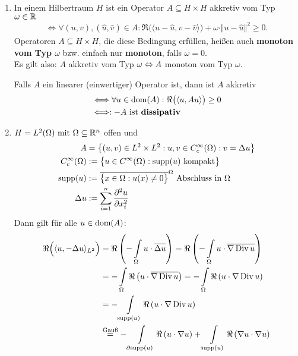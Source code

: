 \begin{beispiel}\
\begin{enumerate}[label=(\alph*)]
\item In einem Hilbertraum $H$ ist ein Operator $A\subseteq H\times H$ akkretiv vom Typ $\omega\in\mathbb{R}$
\begin{align*}
\Longleftrightarrow\forall(u,v),(\hat{u},\hat{v})\in A:
 \Re\big(\langle u-\hat{u},v-\hat{v}\rangle\big)+\omega\cdot\Vert u-\hat{u}\Vert^2\geq0.
\end{align*}
Operatoren $A\subseteq H\times H$, die diese Bedingung erfüllen, heißen auch \textbf{monoton vom Typ $\omega$} bzw. einfach nur \textbf{monoton}, falls $\omega=0$.\\
Es gilt also: $A$ akkretiv vom Typ $\omega\Leftrightarrow A$ monoton vom Typ $\omega$.

Falls $A$ ein linearer (einwertiger) Operator ist, dann ist $A$ akkretiv
\begin{align*}
&\Longleftrightarrow\forall u\in\text{dom}(A):\Re\big(\langle u, Au\rangle\big)\geq0\\
&\Longleftrightarrow: -A\text{ ist \textbf{dissipativ}}
\end{align*}
\item $H=L^2(\Omega)\text{ mit }\Omega\subseteq\mathbb{R}^n$ offen und 
\begin{align*}
A&=\big\lbrace(u,v)\in L^2\times L^2:u,v\in C_c^\infty(\Omega):v=\Delta u\big\rbrace\\
C_c^\infty(\Omega)&:=\big\lbrace u\in C^\infty(\Omega):\text{supp}(u)\text{ kompakt}\big\rbrace\\
\text{supp}(u)&:=\overline{\big\lbrace x\in\Omega:u(x)\neq0\big\rbrace}^\Omega\text{ Abschluss in }\Omega\\
\Delta u&:=\sum\limits_{i=1}^n\frac{\partial^2 u}{\partial x_i^2}
\end{align*}
Dann gilt für alle $u\in\text{dom}(A)$:
\begin{align*}
\Re\Big(\langle u,-\Delta u\rangle_{L^2}\Big) 
&= \Re\left(-\int\limits_\Omega u\cdot\overline{\Delta u}\right) = \Re\left(-\int\limits_\Omega u\cdot\overline{\nabla \Div u}\right)\\
&= -\int\limits_\Omega \Re \left(u\cdot\overline{\nabla \Div u}\right) = -\int\limits_\Omega \Re \left(u\cdot\nabla \Div u\right)\\
&= -\int\limits_{\supp(u)} \Re \left(u\cdot\nabla \Div u\right)\\
&\stackeq{\text{Gauß}}
-\int\limits_{\partial\supp(u)} \Re \left(u\cdot\nabla u\right) + \int\limits_{\supp(u)} \Re \left(\nabla u\cdot\nabla u\right)\\

\end{align*}
\end{enumerate}
\end{beispiel}
